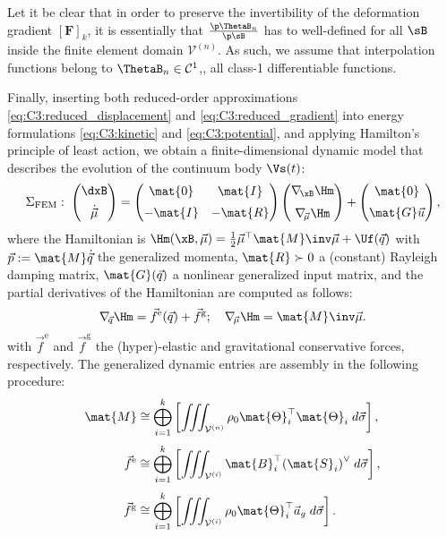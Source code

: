 %
\begin{rmk}
Let it be clear that in order to preserve the invertibility of the deformation gradient $[\boldsymbol{F}]_k$, it is essentially that $\frac{\p \ThetaB_n}{\p \sB}$ has to well-defined for all $\sB$ inside the finite element domain $\mathcal{V}^{(n)}$. As such, we assume that interpolation functions belong to $\ThetaB_n \in \mathcal{C}^{1}$,\ie, all class-1 differentiable functions.
\end{rmk}
%
Finally, inserting both reduced-order approximations \eqref{eq:C3:reduced_displacement} and \eqref{eq:C3:reduced_gradient} into energy formulations \eqref{eq:C3:kinetic} and \eqref{eq:C3:potential}, and applying Hamilton's principle of least action, we obtain a finite-dimensional dynamic model that describes the evolution of the continuum body
$\Vs(t)$:
%
\begin{equation}
\Sigma_{\text{FEM}}: \; \begin{pmatrix} \dxB \\[0.5em] \dot{\vec{\mu}} \end{pmatrix} = \begin{pmatrix} \mat{0} & \mat{I} \\[0.5em] - \mat{I} & -\mat{R}\end{pmatrix} \begin{pmatrix} \nabla_{\!\xB} \Hm \\[0.6em] \nabla_{\!\vec{\mu}}\Hm \end{pmatrix} + \begin{pmatrix} \mat{0} \\[0.5em] \mat{G} \vec{u} \end{pmatrix} ,
\label{eq:C3:modelFEM}
\end{equation}
%
where the Hamiltonian is $\Hm(\xB,\vec{\mu}) = \tfrac{1}{2} \vec{\mu}^\top \mat{M}\inv \vec{\mu} + \Uf(\vec{q})$ with $\vec{p} := \mat{M}\dot{\vec{q}}$ the generalized momenta, $\mat{R}\succ 0$ a (constant) Rayleigh damping matrix, $\mat{G}(\vec{q})
$ a nonlinear generalized input matrix, and the partial derivatives of the Hamiltonian are computed as follows:
%
\begin{align}
\nabla_{\!\vec{q}}\Hm  = \vec{f}^{\text{e}}(\vec{q}) + \vec{f}^{\text{g}}; \quad
\nabla_{\!\vec{\mu}}\Hm = \mat{M}\inv\vec{\mu}.
\end{align}
%
with $\vec{f}^{\text{e}}$ and $\vec{f}^{\text{g}}$ the (hyper)-elastic and gravitational conservative forces, respectively. The generalized dynamic entries are assembly in the following procedure:
%
\begin{align}
\mat{M} & \cong \bigoplus^{k}_{i=1} \left[\iiint_{\mathcal{V}^{(n)}} \rho_0 {\mat{\Theta}}_i^\top {\mat{\Theta}}_i \; d\vec{\sigma} \right],\\[.25em]
%
\vec{f}^{\text{e}} & \cong \bigoplus^{k}_{i=1} \left[\iiint_{\mathcal{V}^{(i)}} {\mat{B}}_i^\top {\left(\mat{S}_i \right)}^{\vee} \; d\vec{\sigma} \right], \\[.25em]
%
\vec{f}^{\text{g}} & \cong \bigoplus^{k}_{i=1} \left[ \iiint_{\mathcal{V}^{(i)}} \rho_0 \mat{\Theta}_i^\top \vec{a}_g \; d\vec{\sigma} \right].
\end{align}
